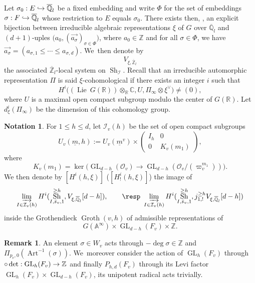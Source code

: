 \documentclass[JEP,XML,SOM,Unicode,published]{cedram}
\newcommand{\NoChangel}[1]{%
\expandafter\let\csname old\string#1\endcsname=#1
\let#1=\relax
\newcommand{#1}{\mathcode`l="716C\csname old\string#1\endcsname\mathcode`l="7160 }%
}
\def\hto{\mathrel{\lhook\joinrel\to}}
\DeclareMathOperator{\GL}{GL}
\theoremstyle{plain}
\theoremstyle{definition}
\newtheorem*{remark}{Remark}
\newtheorem{nota}[equation]{Notation}
\numberwithin{equation}{subsection}
\newcommand\Am{{\mathbb A}}
\newcommand\Qm{{\mathbb Q}}
\newcommand\Zm{{\mathbb Z}}
\newcommand\Cm{{\mathbb C}}
\newcommand\Rm{{\mathbb R}}
\newcommand\IC{{\mathcal I}}
\newcommand\OC{{\mathcal O}}
\DeclareMathOperator{\lie}{Lie}
\DeclareMathOperator{\sh}{Sh}
\DeclareMathOperator{\art}{Art}
\DeclareMathOperator{\groth}{Groth}
\DeclareMathOperator{\val}{val}\NoChangel{\val}
\let \oo=\infty
\begin{document}
Let $\sigma_0:E \hto
\overline{\Qm}_l$ be a fixed embedding and write $\Phi$ for the set of embeddings
$\sigma:F \hto \overline \Qm_l$ whose restriction to $E$ equals $\sigma_0$.
There exists then, \cf \cite[p.\,97]{h-t}, an explicit bijection between irreducible algebraic representations
$\xi$ of $G$ over $\overline \Qm_l$ and $(d+1)$-uples
$\bigl (a_0, (\overrightarrow{a_\sigma})_{\sigma \in \Phi} \bigr)$,
where $a_0 \in \Zm$ and for all $\sigma \in \Phi$, we have \hbox{$\overrightarrow{a_\sigma}=
(a_{\sigma,1} \leq \cdots \leq a_{\sigma,d})$}.
We~then denote by
\[
V_{\xi,\overline \Zm_l}
\]
the associated $\overline \Zm_l$-local system on $\sh_\IC$.
Recall that an irreducible automorphic representation $\Pi$ is said $\xi$-cohomological if there exists
an integer $i$ such that
\[
H^i \bigl ((\lie ~G(\Rm)) \otimes_\Rm \Cm,U,\Pi_\oo \otimes \xi^\vee \bigr) \neq (0),
\]
where $U$ is a maximal open compact subgroup modulo the center of $G(\Rm)$.
Let $d_\xi^i(\Pi_\oo)$ be the dimension of this cohomology group.

\label{para-hecke}

\begin{nota} \label{nota-hixi}
For $1 \leq h \leq d$, let $\IC_v(h)$ be the set of open compact subgroups
\[
U_v(\underline m,h):=
U_v(\underline m^v) \times \left (\begin{array}{cc} I_h & 0 \\ 0 & K_v(m_1) \end{array} \right),
\]
where
\[
K_v(m_1)=\ker \bigl (\GL_{d-h}(\OC_v) \to \GL_{d-h}(\OC_v/ (\varpi_v^{m_1})) \bigr).
\]
We then denote by $[H^i(h,\xi)]$ (\resp $[H^i_!(h,\xi)]$) the image of
\[
\varinjlim_{{I \in \IC_v(h)}} H^i(\sh_{I,\bar s_v,1}^{\geq h}, V_{\xi,\overline \Qm_l}[d-h]),
\qquad \hbox{\resp }
\varinjlim_{{I \in \IC_v(h)}} H^i(\sh_{I,\bar s_v,1}^{\geq h}, j^{\geq h}_{1,!} V_{\xi,\overline \Qm_l}[d-h])
\]
inside the Grothendieck $\groth(v,h)$ of admissible representations of
\[
G(\Am^{\oo}) \times \GL_{d-h}(F_v) \times \Zm.
\]
\end{nota}

\begin{remark}
An element $\sigma \in W_v$ acts through $-\deg \sigma \in \Zm$ and $\Pi_{p_v,0}(\art^{-1} (\sigma))$.
We~moreover consider the action of $\GL_{h}(F_v)$ through
$\val \circ \det: \GL_{h}(F_v) \to \Zm$ and finally
$P_{h,d}(F_v)$ through its Levi factor $\GL_{h}(F_v) \times \GL_{d-h}(F_v)$, \ie its unipotent radical acts trivially.
\end{remark}
\end{document}
